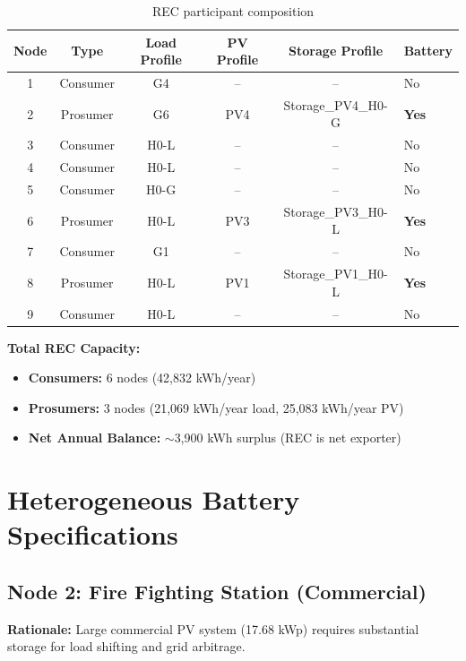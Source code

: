 \documentclass[11pt,a4paper]{article}
\begin{document}
\begin{table}[h]
\centering
\small
\begin{tabular}{@{}cccccl@{}}
\toprule
\textbf{Node} & \textbf{Type} & \textbf{Load Profile} & \textbf{PV Profile} & \textbf{Storage Profile} & \textbf{Battery} \\ 
\midrule
1 & Consumer & G4 & -- & -- & No \\
2 & Prosumer & G6 & PV4 & Storage\_PV4\_H0-G & \textbf{Yes} \\
3 & Consumer & H0-L & -- & -- & No \\
4 & Consumer & H0-L & -- & -- & No \\
5 & Consumer & H0-G & -- & -- & No \\
6 & Prosumer & H0-L & PV3 & Storage\_PV3\_H0-L & \textbf{Yes} \\
7 & Consumer & G1 & -- & -- & No \\
8 & Prosumer & H0-L & PV1 & Storage\_PV1\_H0-L & \textbf{Yes} \\
9 & Consumer & H0-L & -- & -- & No \\
\bottomrule
\end{tabular}
\caption{REC participant composition}
\end{table}

\textbf{Total REC Capacity:}
\begin{itemize}
    \item \textbf{Consumers:} 6 nodes (42,832 kWh/year)
    \item \textbf{Prosumers:} 3 nodes (21,069 kWh/year load, 25,083 kWh/year PV)
    \item \textbf{Net Annual Balance:} $\sim$3,900 kWh surplus (REC is net exporter)
\end{itemize}

\section{Heterogeneous Battery Specifications}

\subsection{Node 2: Fire Fighting Station (Commercial)}

\textbf{Rationale:} Large commercial PV system (17.68 kWp) requires substantial storage for load shifting and grid arbitrage.
\end{document}
